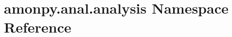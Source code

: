 \hypertarget{namespaceamonpy_1_1anal_1_1analysis}{\section{amonpy.\-anal.\-analysis Namespace Reference}
\label{namespaceamonpy_1_1anal_1_1analysis}
}
